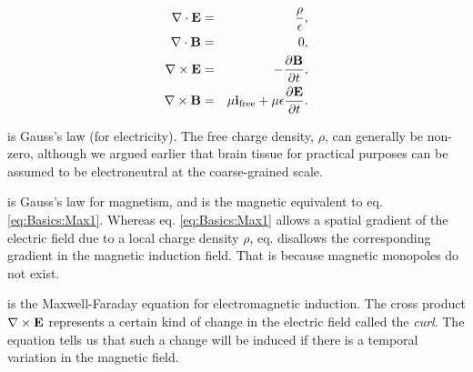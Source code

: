 \begin{eqnarray}
{\bf \nabla}\cdot {\bf E} & = & \frac{\rho}{\epsilon}, \label{eq:Basics:Max1} \\
{\bf \nabla} \cdot {\bf B} & = & 0,  \label{eq:Basics:Max2} \\
{\bf \nabla} \times {\bf E} & = & - \frac{\partial {\bf B}}{\partial t}, \label{eq:Basics:Max3} \\
{\bf \nabla} \times {\bf B} & = & \mu {\bf i}_\text{free} + \mu\epsilon\frac{\partial {\bf E}}{\partial t}.  \label{eq:Basics:Max4}
\end{eqnarray}

 is Gauss's law (for electricity). The free charge density, $\rho$, can generally be non-zero, although we argued earlier that brain tissue for practical purposes can be assumed to be electroneutral at the coarse-grained scale.

 is Gauss's law for magnetism, and is the magnetic equivalent to eq. \ref{eq:Basics:Max1}. Whereas eq. \ref{eq:Basics:Max1} allows a spatial gradient of the electric field due to a local charge density $\rho$, eq. \sntxt{\sout{\ref{eq:Basics:Max1}} \ref{eq:Basics:Max2}} disallows the corresponding gradient in the magnetic induction field. That is because magnetic monopoles do not exist. 

 is the Maxwell-Faraday equation for electromagnetic induction. The cross product ${\bf \nabla} \times {\bf E}$ represents a certain kind of change in the electric field called the \textit{curl}. The equation tells us that such a change will be induced if there is a temporal variation in the magnetic field.

